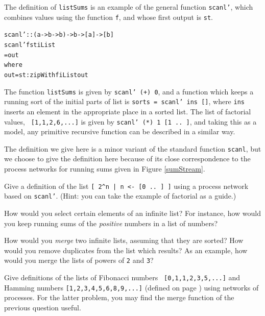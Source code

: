 The definition of \texttt{listSums} is an example of the general function \texttt{scanl'},
which combines values using the function \texttt{f}, and whose first output is
\texttt{st}.
\begin{alltt}
scanl' :: (a -> b -> b) -> b -> [a] -> [b]
scanl' f st iList
  = out 
    where
    out = st : zipWith f iList out
\end{alltt}
The function \texttt{listSums} is given by \texttt{scanl' (+) 0}, and a function which
keeps a running sort of the initial parts of list is 
\texttt{sorts = scanl' ins []}, where \texttt{ins} inserts an element in the
appropriate place in a sorted list. The list of factorial values, 
\texttt{
[1,1,2,6,...]} is given by \texttt{scanl' (*) 1 [1 ..\ ]}, and taking this as a
model, any primitive recursive function 
can be described in a similar way.

The definition we give here is a minor variant of
the standard function \texttt{scanl},
but we choose to give the definition here because of its close
correspondence to the process networks for running sums given in Figure
\ref{sumStream}.

\begin{exercises}

\item
Give a definition of the list \texttt{[ 2\^{}n | n <- [0 ..\ ] ]} using a process
network based on \texttt{scanl'}. (Hint: you can take the example of factorial as a
guide.)

\item
How would you select certain elements of an infinite list? For instance, how
would you keep running sums of the {\em positive\/} numbers in a list of
numbers?

\item
How would you {\em merge\/} two infinite lists, assuming that they are
sorted?
How would you remove duplicates from the list which results? As an example,
how would you merge the lists of powers of \texttt{2} and \texttt{3}?

\item
Give definitions of the lists of Fibonacci numbers 
\texttt{
[0,1,1,2,3,5,...]} and Hamming numbers \texttt{[1,2,3,4,5,6,8,9,...]} (defined on
page \pageref{HamNos}) using 
networks of processes. For the latter problem, you may find
the merge function of the previous question useful.


\end{exercises}

